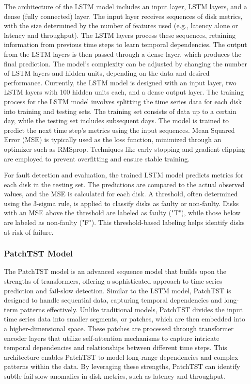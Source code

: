 \documentclass{article}
\begin{document}
\quad The architecture of the LSTM model includes an input layer, LSTM layers, and a dense (fully connected) layer. The input layer receives sequences of disk metrics, with the size determined by the number of features used (e.g., latency alone or latency and throughput). The LSTM layers process these sequences, retaining information from previous time steps to learn temporal dependencies. The output from the LSTM layers is then passed through a dense layer, which produces the final prediction. The model's complexity can be adjusted by changing the number of LSTM layers and hidden units, depending on the data and desired performance. Currently, the LSTM model is designed with an input layer, two LSTM layers with 100 hidden units each, and a dense output layer.
The training process for the LSTM model involves splitting the time series data for each disk into training and testing sets. The training set consists of data up to a certain day, while the testing set includes subsequent days. The model is trained to predict the next time step's metrics using the input sequences. Mean Squared Error (MSE) is typically used as the loss function, minimized through an optimizer such as RMSprop. Techniques like early stopping and gradient clipping are employed to prevent overfitting and ensure stable training.

\quad For fault detection and evaluation, the trained LSTM model predicts metrics for each disk in the testing set. The predictions are compared to the actual observed values, and the MSE is calculated for each disk. A threshold, often determined using the 3-sigma rule, is applied to classify disks as faulty or non-faulty. Disks with an MSE above the threshold are labeled as faulty ("T"), while those below are labeled as non-faulty ("F"). This threshold-based labeling helps identify disks at risk of failure. 

\subsubsection{PatchTST Model}

\quad The PatchTST model is an advanced sequence model that builds upon the strengths of transformers, offering a sophisticated approach to time series prediction and fail-slow detection. Similar to the LSTM model, PatchTST is designed to handle sequential data, capturing temporal dependencies and long-term patterns effectively. Unlike traditional models, PatchTST divides the input time series data into smaller segments, or patches, which are then embedded into a higher-dimensional space. These patches are processed through transformer encoder layers that utilize self-attention mechanisms to capture intricate temporal dependencies and relationships between different time steps. This architecture enables PatchTST to model long-range dependencies and complex patterns within the data. By leveraging these strengths, PatchTST can identify subtle fail-slow anomalies in disk metrics, such as latency and throughput.
\end{document}
